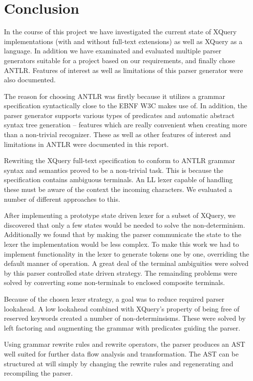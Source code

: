 \chapter{Conclusion}
\label{chapter:conclusion}

In the course of this project we have investigated the current state of XQuery
implementations (with and without full-text extensions) as well as XQuery as a
language. In addition we have examinated and evaluated multiple parser
generators suitable for a project based on our requirements, and finally chose
ANTLR. Features of interest as well as limitations of this parser generator
were also documented.

The reason for choosing ANTLR was firstly because it utilizes a grammar
specification syntactically close to the EBNF W3C makes use of. In addition,
the parser generator supports various types of predicates and automatic
abstract syntax tree generation -- features which are really convenient when
creating more than a non-trivial recognizer. These as well as other features of
interest and limitations in ANTLR were documented in this report.   

Rewriting the XQuery full-text specification to conform to ANTLR grammar syntax
and semantics proved to be a non-trivial task. This is because the
specification contains ambiguous terminals. An LL lexer capable of handling
these must be aware of the context the incoming characters. We evaluated a
number of different approaches to this.

After implementing a prototype state driven lexer for a subset of XQuery, we
discovered that only a few states would be needed to solve the non-determinism.
Additionally we found that by making the parser communicate the state to the
lexer the implementation would be less complex. To make this work we had to
implement functionality in the lexer to generate tokens one by one, overriding
the default manner of operation. A great deal of the terminal ambiguities were
solved by this parser controlled state driven strategy. The remainding problems
were solved by converting some non-terminals to enclosed composite terminals.  

Because of the chosen lexer strategy, a goal was to reduce required parser
lookahead. A low lookahead combined with XQuery's property of being free of 
reserved keywords created a number of non-determinsisms. These were solved by
left factoring and augmenting the grammar with predicates guiding the parser. 

Using grammar rewrite rules and rewrite operators, the parser produces an AST
well suited for further data flow analysis and transformation. The AST can be
structured at will simply by changing the rewrite rules and regenerating and
recompiling the parser.   

